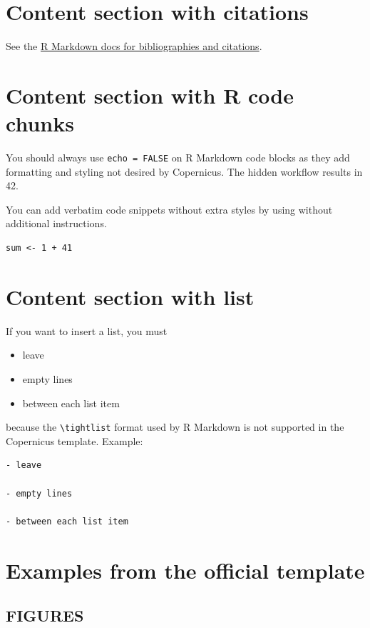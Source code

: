 \documentclass[gmd, manuscript]{copernicus}
\begin{document}
\section{Content section with citations}

See the
\href{http://rmarkdown.rstudio.com/authoring_bibliographies_and_citations.html}{R
Markdown docs for bibliographies and citations}.

\section{Content section with R code chunks}

You should always use \texttt{echo\ =\ FALSE} on R Markdown code blocks
as they add formatting and styling not desired by Copernicus. The hidden
workflow results in 42.

You can add verbatim code snippets without extra styles by using
\texttt{\textasciigrave{}\textasciigrave{}\textasciigrave{}} without
additional instructions.

\begin{verbatim}
sum <- 1 + 41
\end{verbatim}

\section{Content section with list}

If you want to insert a list, you must

\begin{itemize}
\item
  leave
\item
  empty lines
\item
  between each list item
\end{itemize}

because the \texttt{\textbackslash{}tightlist} format used by R Markdown
is not supported in the Copernicus template. Example:

\begin{verbatim}
- leave

- empty lines

- between each list item
\end{verbatim}

\section{Examples from the official template}

\subsection{FIGURES}
\end{document}

